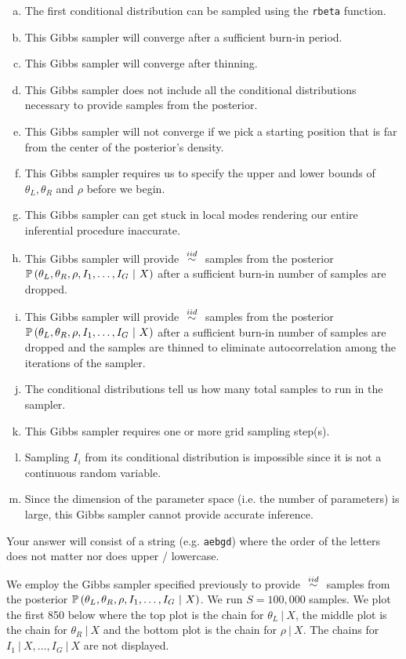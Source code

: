 \documentclass[12pt]{article}
\newcommand{\instr}{\scriptsize Your answer will consist of a string (e.g. \texttt{aebgd}) where the order of the letters does not matter nor does upper / lowercase. \normalsize}
\begin{document}
\begin{enumerate}[(a)]
\item The first conditional distribution can be sampled using the \texttt{rbeta} function.
\item This Gibbs sampler will converge after a sufficient burn-in period.
\item This Gibbs sampler will converge after thinning.
\item This Gibbs sampler does not include all the conditional distributions necessary to provide samples from the posterior.
\item This Gibbs sampler will not converge if we pick a starting position that is far from the center of the posterior's density.
\item This Gibbs sampler requires us to specify the upper and lower bounds of $\theta_L, \theta_R$ and $\rho$ before we begin.
\item This Gibbs sampler can get stuck in local modes rendering our entire inferential procedure inaccurate.
\item This Gibbs sampler will provide $\iid$ samples from the posterior $\mathbb{P}\left(\theta_L, \theta_R, \rho, I_1, \ldots, I_G~|~X\right)$ after a sufficient burn-in number of samples are dropped.
\item This Gibbs sampler will provide $\iid$ samples from the posterior $\mathbb{P}\left(\theta_L, \theta_R, \rho, I_1, \ldots, I_G~|~X\right)$ after a sufficient burn-in number of samples are dropped and the samples are thinned  to eliminate autocorrelation among the iterations of the sampler.
\item The conditional distributions tell us how many total samples to run in the sampler.
\item This Gibbs sampler requires one or more grid sampling step(s).
\item Sampling $I_i$ from its conditional distribution is impossible since it is not a continuous random variable.
\item Since the dimension of the parameter space (i.e. the number of parameters) is large, this Gibbs sampler cannot provide accurate inference.
\end{enumerate}\eenum\instr\pagebreak



\problem [4min] We employ the Gibbs sampler specified previously to provide $\iid$ samples from the posterior $\mathbb{P}\left(\theta_L, \theta_R, \rho, I_1, \ldots, I_G~|~X\right)$. We run $S=100,000$ samples. We plot the first 850 below where the top plot is the chain for $\theta_L~|~X$, the middle plot is the chain for $\theta_R~|~X$ and the bottom plot is the chain for $\rho~|~X$. The chains for $I_1~|~X, \ldots, I_G~|~X$ are not displayed.
\end{document}
